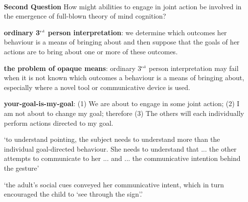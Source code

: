 \documentclass[11pt]{extarticle}
\begin{document}
\begin{multicols}{3}
\ %

{\Large
\textbf{Second Question}
How might abilities to engage in joint action be involved in the emergence of full-blown theory of mind cognition?
}

\textbf{ordinary 3$^{\textrm{\tiny rd}}$ person interpretation}: we determine which outcomes her behaviour is a means of bringing about and then suppose that the goals of her actions are to bring about one or more of these outcomes.

\textbf{the problem of opaque means}: ordinary 3$^{\textrm{\tiny rd}}$ person interpretation may fail when it is not known which outcomes a behaviour is a means of bringing about, especially where a novel tool or communicative device is used.

\textbf{your-goal-is-my-goal}: (1) We are about to engage in some joint action; (2) I am not about to change my goal; therefore (3) The others will each individually perform actions directed to my goal.


`to understand pointing, the subject needs to understand more than the individual goal-directed behaviour. She needs to understand that ... the other attempts to communicate to her ...  and ... the communicative intention behind the gesture'\citep{Moll:2007gu}

`the adult’s social cues conveyed her communicative intent, which in turn encouraged the child to `see through the sign'.'
\citep%
{leekam_adults_2010}




\footnotesize 


\end{multicols}
\end{document}
